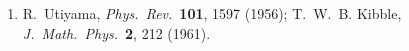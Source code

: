 
\begin{enumerate}
  \item{}\label{ch12-ref-1}
  R.~Utiyama, \emph{Phys.\ Rev.}\ \textbf{101}, 1597 (1956);
  T.~W.~B. Kibble, \emph{J.\ Math.\ Phys.}\ \textbf{2}, 212 (1961).
\end{enumerate}
